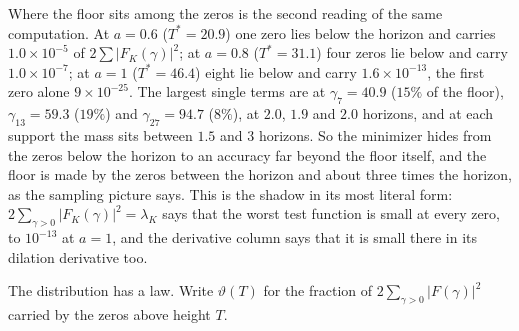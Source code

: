 \documentclass[11pt]{article}
\theoremstyle{definition}
\theoremstyle{remark}
\newcommand{\Tst}{T^{*}}
\begin{document}
Where the floor sits among the zeros is the second reading of the same computation. At $a=0.6$ ($\Tst=20.9$) one zero lies below the horizon and carries $1.0\times10^{-5}$ of $2\sum|F_K(\gamma)|^2$; at $a=0.8$ ($\Tst=31.1$) four zeros lie below and carry $1.0\times10^{-7}$; at $a=1$ ($\Tst=46.4$) eight lie below and carry $1.6\times10^{-13}$, the first zero alone $9\times10^{-25}$. The largest single terms are at $\gamma_7=40.9$ ($15\%$ of the floor), $\gamma_{13}=59.3$ ($19\%$) and $\gamma_{27}=94.7$ ($8\%$), at $2.0$, $1.9$ and $2.0$ horizons, and at each support the mass sits between $1.5$ and $3$ horizons. So the minimizer hides from the zeros below the horizon to an accuracy far beyond the floor itself, and the floor is made by the zeros between the horizon and about three times the horizon, as the sampling picture says. This is the shadow in its most literal form: $2\sum_{\gamma>0}|F_K(\gamma)|^2=\lambda_K$ says that the worst test function is small at every zero, to $10^{-13}$ at $a=1$, and the derivative column says that it is small there in its dilation derivative too.

The distribution has a law. Write $\vartheta(T)$ for the fraction of $2\sum_{\gamma>0}|F(\gamma)|^2$ carried by the zeros above height $T$.
\end{document}
